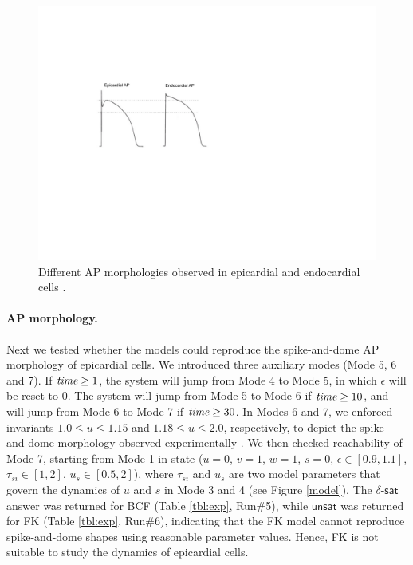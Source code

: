 
\begin{figure}[th]
\centering
\includegraphics[scale=0.8]{fig-ap}
\caption{Different AP morphologies observed in epicardial and endocardial cells \cite{nabauer96}.}
\label{ap}
\end{figure}

\paragraph{AP morphology.}
Next we tested whether the models could reproduce the spike-and-dome AP morphology of epicardial cells. We introduced three auxiliary modes (Mode 5, 6 and 7). If $\text{\em time} \ge 1$, the system will jump from Mode 4 to Mode 5, in which $\epsilon$ will be reset to $0$. The system will jump from Mode 5 to Mode 6 if $\text{\em time} \ge 10$, and will jump from Mode 6 to Mode 7 if $\text{\em time} \ge 30$. In Modes 6 and 7, we enforced invariants $1.0 \le u \le 1.15$ and $1.18 \le u \le 2.0$, respectively, to depict the spike-and-dome morphology observed experimentally \cite{nabauer96}. We then checked reachability of Mode 7, starting from Mode 1 in state ($u = 0$, $v = 1$, $w = 1$, $s = 0$, $\epsilon \in [0.9,1.1]$, $\tau_{si} \in [1,2]$, $u_s \in [0.5,2]$),
where $\tau_{si}$ and $u_s$ are two model parameters that govern the dynamics of $u$ and $s$ in
Mode 3 and 4 (see Figure \ref{model}).
The $\delta$-$\mathsf{sat}$ answer
was returned for BCF  (Table \ref{tbl:exp}, Run\#5), while $\mathsf{unsat}$ was returned for FK (Table \ref{tbl:exp}, Run\#6), indicating that the FK model cannot reproduce spike-and-dome shapes using reasonable parameter values. Hence, FK is not suitable to study the dynamics of epicardial cells.

